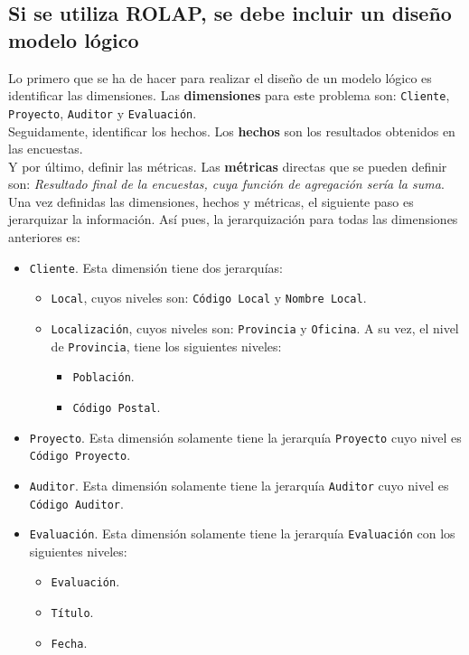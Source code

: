 \medskip
\subsection{Si se utiliza ROLAP, se debe incluir un diseño modelo lógico}
\label{08}
Lo primero que se ha de hacer para realizar el diseño de un modelo lógico es identificar las dimensiones. Las \textbf{dimensiones} para este problema son: \texttt{Cliente}, \texttt{Proyecto}, \texttt{Auditor} y \texttt{Evaluación}. \\

Seguidamente, identificar los hechos. Los \textbf{hechos} son los resultados obtenidos en las encuestas. \\

Y por último, definir las métricas. Las \textbf{métricas} directas que se pueden definir son: \textit{Resultado final de la encuestas, cuya función de agregación sería la suma}.\\

Una vez definidas las dimensiones, hechos y métricas, el siguiente paso es jerarquizar la información. Así pues, la jerarquización para todas las dimensiones anteriores es:
\begin{itemize}
 \item \texttt{Cliente}. Esta dimensión tiene dos jerarquías:
 \begin{itemize}
  \item \texttt{Local}, cuyos niveles son: \texttt{Código Local} y \texttt{Nombre Local}.
  \item \texttt{Localización}, cuyos niveles son: \texttt{Provincia} y \texttt{Oficina}. A su vez, el nivel de \texttt{Provincia}, tiene los siguientes niveles:
  \begin{itemize}
   \item \texttt{Población}.
   \item \texttt{Código Postal}.
  \end{itemize}

 \end{itemize}

 \item \texttt{Proyecto}. Esta dimensión solamente tiene la jerarquía \texttt{Proyecto} cuyo nivel es \texttt{Código Proyecto}.
 \item \texttt{Auditor}. Esta dimensión solamente tiene la jerarquía \texttt{Auditor} cuyo nivel es \texttt{Código Auditor}.
 \item \texttt{Evaluación}. Esta dimensión solamente tiene la jerarquía \texttt{Evaluación} con los siguientes niveles:
\begin{itemize}
 \item \texttt{Evaluación}.
 \item \texttt{Título}.
 \item \texttt{Fecha}.
\end{itemize}
\end{itemize}

